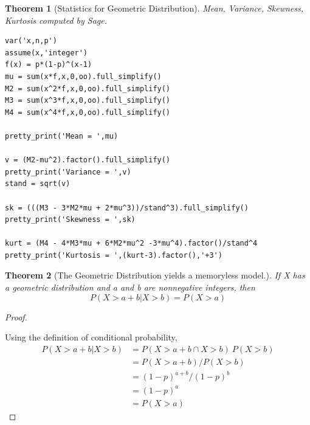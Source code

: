 \documentclass[10pt,]{book}
\theoremstyle{plain}
\newtheorem{theorem}{Theorem}[section]
\theoremstyle{definition}
\theoremstyle{definition}
\theoremstyle{definition}
\numberwithin{equation}{section}
\begin{document}
\begin{theorem}[{Statistics for Geometric Distribution}]\label{theorem-39}
Mean, Variance, Skewness, Kurtosis computed by Sage.
		
\begin{lstlisting}[style=sageinput]
var('x,n,p')
assume(x,'integer')
f(x) = p*(1-p)^(x-1)
mu = sum(x*f,x,0,oo).full_simplify()
M2 = sum(x^2*f,x,0,oo).full_simplify()
M3 = sum(x^3*f,x,0,oo).full_simplify()
M4 = sum(x^4*f,x,0,oo).full_simplify()

pretty_print('Mean = ',mu)

v = (M2-mu^2).factor().full_simplify()
pretty_print('Variance = ',v)
stand = sqrt(v)

sk = (((M3 - 3*M2*mu + 2*mu^3))/stand^3).full_simplify()
pretty_print('Skewness = ',sk)

kurt = (M4 - 4*M3*mu + 6*M2*mu^2 -3*mu^4).factor()/stand^4
pretty_print('Kurtosis = ',(kurt-3).factor(),'+3')
\end{lstlisting}
\end{theorem}
\begin{theorem}[{The Geometric Distribution yields a memoryless model.}]\label{theorem-40}
If X has a geometric distribution and a and b are nonnegative integers, then
	\begin{equation*}P( X > a + b | X > b ) = P( X > a)\end{equation*}
\end{theorem}
\begin{proof}\hypertarget{proof-40}{}
Using the definition of conditional probability,
	\begin{align*}
P( X > a + b | X > b ) & = P( X > a + b \cap X > b ) \ P( X > b)\\
 & = P( X > a + b ) / P( X > b)\\
 & = (1-p)^{a+b} / (1-p)^b\\
 & = (1-p)^a\\
 & = P(X > a)
\end{align*}
\end{proof}
\typeout{************************************************}
\typeout{************************************************}
\end{document}
